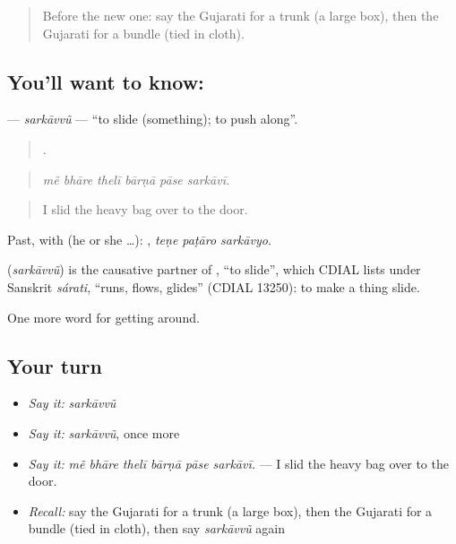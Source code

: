 \label{lesson:GU-C394-sarkavvu}



\begin{quote}
Before the new one: say the Gujarati for a trunk (a large box), then the Gujarati for a bundle (tied in cloth).
\end{quote}

\subsection*{You'll want to know: }
\textbf{} — \emph{sarkāvvũ} — \textquotedblleft{}to slide (something); to push along\textquotedblright{}.

\begin{quote}
     .
\end{quote}

\begin{quote}
\emph{mẽ bhāre thelī bārṇā pāse sarkāvī.}
\end{quote}

\begin{quote}
I slid the heavy bag over to the door.
\end{quote}

Past, with  (he or she …):   , \emph{teṇe paṭāro sarkāvyo}.

\begin{cousinweb}
\textbf{} (\emph{sarkāvvũ}) is the causative partner of , \textquotedblleft{}to slide\textquotedblright{}, which CDIAL lists under Sanskrit \emph{sárati}, \textquotedblleft{}runs, flows, glides\textquotedblright{} (CDIAL 13250): to make a thing slide.
\end{cousinweb}

\begin{grammarlens}[title={What you've built}]
One more word for getting around.
\end{grammarlens}

\subsection*{Your turn}
\begin{itemize}
\raggedright
  \item \emph{Say it:} \emph{sarkāvvũ}
  \item \emph{Say it:} \emph{sarkāvvũ}, once more
  \item \emph{Say it:} \emph{mẽ bhāre thelī bārṇā pāse sarkāvī.} — I slid the heavy bag over to the door.
  \item \emph{Recall:} say the Gujarati for a trunk (a large box), then the Gujarati for a bundle (tied in cloth), then say \emph{sarkāvvũ} again
\end{itemize}

